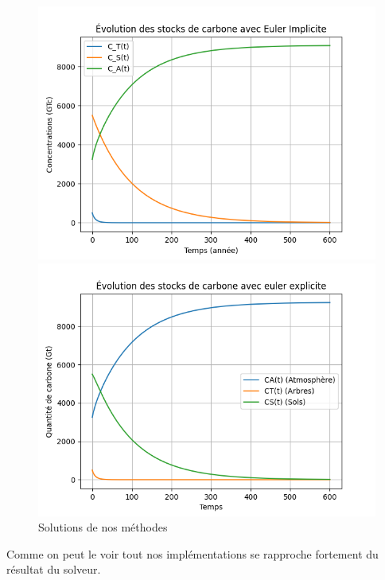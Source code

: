 \documentclass[12pt]{article}
\theoremstyle{saav}
\begin{document}
\begin{figure}[htbp]
		\begin{minipage}{0.48\textwidth}
			\centering
			\includegraphics[width=\linewidth]{images/Euler_Implicite.png}

		\end{minipage}
		\begin{minipage}{0.48\textwidth}
			\centering
			\includegraphics[width=\linewidth]{images/Euler_Explicite.png}
			
		\end{minipage}
		\caption{Solutions de nos méthodes}
		
	\end{figure}
	\newpage
	
	Comme on peut le voir tout nos implémentations se rapproche fortement du résultat du solveur.
	
\end{document}
